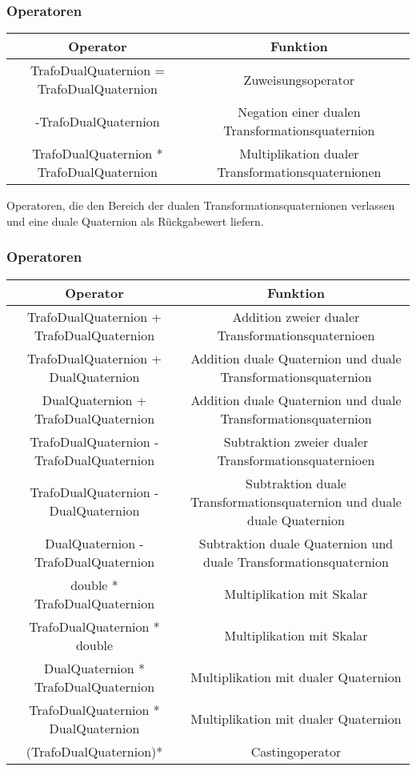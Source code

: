 	\subsubsection{Operatoren}
	\begin{tabular}{|c|c|}
			\hline
			Operator & Funktion\\ 
			\hline
			TrafoDualQuaternion = TrafoDualQuaternion & Zuweisungsoperator\\
			-TrafoDualQuaternion & Negation einer dualen
			Transformationsquaternion\\
			\hline
			TrafoDualQuaternion * TrafoDualQuaternion & Multiplikation dualer
			Transformationsquaternionen\\
			\hline
	\end{tabular}
		
	Operatoren, die den Bereich der dualen Transformationsquaternionen verlassen und eine
	duale Quaternion als Rückgabewert liefern.
	
	\subsubsection{Operatoren}
	\begin{tabular}{|c|c|}
			\hline
			Operator & Funktion\\ 
			\hline
			TrafoDualQuaternion + TrafoDualQuaternion & Addition zweier dualer
			Transformationsquaternioen\\
			\hline
			TrafoDualQuaternion + DualQuaternion & Addition duale Quaternion und duale
			Transformationsquaternion\\
			\hline
			DualQuaternion + TrafoDualQuaternion & Addition duale Quaternion und duale
			Transformationsquaternion\\
			\hline
			TrafoDualQuaternion - TrafoDualQuaternion & Subtraktion zweier dualer
			Transformationsquaternioen\\
			\hline
			TrafoDualQuaternion - DualQuaternion & Subtraktion duale Transformationsquaternion und
			duale	duale Quaternion\\
			\hline
			DualQuaternion - TrafoDualQuaternion & Subtraktion duale Quaternion und duale
			Transformationsquaternion\\
			\hline
			double * TrafoDualQuaternion & Multiplikation mit Skalar\\
			\hline
			TrafoDualQuaternion * double & Multiplikation mit Skalar\\
			\hline
			DualQuaternion * TrafoDualQuaternion & Multiplikation mit dualer Quaternion\\
			\hline
			TrafoDualQuaternion * DualQuaternion & Multiplikation mit dualer Quaternion\\
			\hline
			(TrafoDualQuaternion)* & Castingoperator\\
			\hline
	\end{tabular}
		
